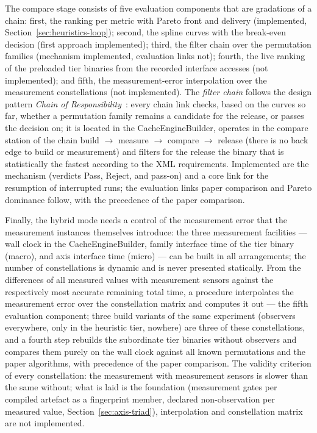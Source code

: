 \begin{nurkurz}
The compare stage consists of five evaluation components that are gradations of a chain: first, the
ranking per metric with Pareto front and delivery (implemented, Section~\ref{sec:heuristics-loop});
second, the spline curves with the break-even decision (first approach implemented); third, the filter
chain over the permutation families (mechanism implemented, evaluation links not); fourth, the live
ranking of the preloaded tier binaries from the recorded interface accesses (not implemented); and
fifth, the measurement-error interpolation over the measurement constellations (not implemented). The
\emph{filter chain} follows the design pattern \emph{Chain of Responsibility}~\cite{gamma1994patterns}:
every chain link checks, based on the curves so far, whether a permutation family remains a candidate for
the release, or passes the decision on; it is located in the CacheEngineBuilder, operates in the compare
station of the chain build $\to$ measure $\to$ compare $\to$ release (there is no back edge to build or
measurement) and filters for the release the binary that is statistically the fastest according to the XML
requirements. Implemented are the mechanism (verdicts Pass, Reject, and pass-on) and a core link for
the resumption of interrupted runs; the evaluation links paper comparison and Pareto dominance follow,
with the precedence of the paper comparison.

Finally, the hybrid mode needs a control of the measurement error that the measurement instances
themselves introduce: the three measurement facilities --- wall clock in the CacheEngineBuilder, family
interface time of the tier binary (macro), and axis interface time (micro) --- can be built in all
arrangements; the number of constellations is dynamic and is never presented statically. From the
differences of all measured values with measurement sensors against the respectively most accurate
remaining total time, a procedure interpolates the measurement error over the constellation matrix and
computes it out --- the fifth evaluation component; three build variants of the same experiment
(observers everywhere, only in the heuristic tier, nowhere) are three of these constellations, and a
fourth step rebuilds the subordinate tier binaries without observers and compares them purely on the
wall clock against all known permutations and the paper algorithms, with precedence of the paper
comparison. The validity criterion of every constellation: the measurement with measurement sensors is
slower than the same without; what is laid is the foundation (measurement gates per compiled artefact
as a fingerprint member, declared non-observation per measured value, Section~\ref{sec:axis-triad}),
interpolation and constellation matrix are not implemented.


\end{nurkurz}
